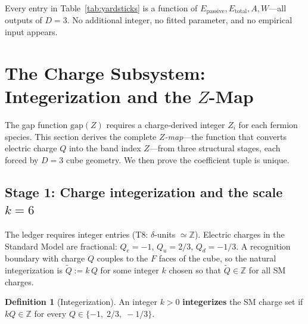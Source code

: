 \documentclass[11pt,a4paper]{article}
\theoremstyle{definition}
\newtheorem{definition}[theorem]{Definition}
\theoremstyle{remark}
\newcommand{\Epass}{E_{\mathrm{passive}}}
\newcommand{\Etot}{E_{\mathrm{total}}}
\newcommand{\tildeQ}{\tilde{Q}}
\newcommand{\Zidx}{Z}
\begin{document}
\noindent
Every entry in Table~\ref{tab:yardsticks} is a function of
$\Epass, \Etot, A, W$---all outputs of $D = 3$.  No additional integer,
no fitted parameter, and no empirical input appears.


\section{The Charge Subsystem: Integerization and the $\Zidx$-Map}
\label{sec:charge}

The gap function $\mathrm{gap}(\Zidx)$ requires a charge-derived integer
$\Zidx_i$ for each fermion species.  This section derives the complete
\emph{$\Zidx$-map}---the function that converts electric charge $Q$ into the
band index $\Zidx$---from three structural stages, each forced by $D = 3$
cube geometry.  We then prove the coefficient tuple is unique.

\subsection{Stage 1: Charge integerization and the scale $k = 6$}

The ledger requires integer entries (T8: $\delta$-units $\simeq \mathbb{Z}$).
Electric charges in the Standard Model are fractional: $Q_e = -1$,
$Q_u = 2/3$, $Q_d = -1/3$.  A recognition boundary with charge $Q$ couples
to the $F$ faces of the cube, so the natural integerization is
$\tildeQ := k\,Q$ for some integer $k$ chosen so that $\tildeQ \in \mathbb{Z}$
for all SM charges.

\begin{definition}[Integerization]
\label{def:integerizes}
An integer $k > 0$ \textbf{integerizes} the SM charge set if $kQ \in
\mathbb{Z}$ for every $Q \in \{-1,\; 2/3,\; -1/3\}$.
\end{definition}
\end{document}
